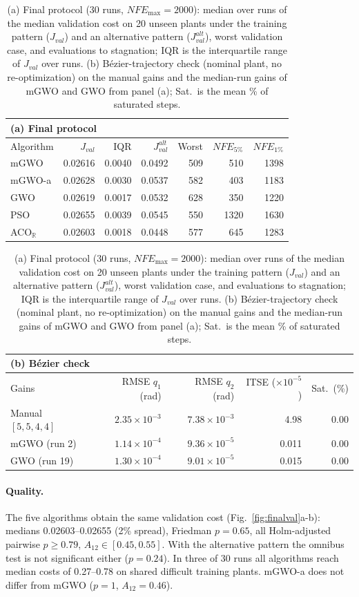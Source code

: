 \documentclass[10pt,journal,compsoc]{IEEEtran}
\newcommand{\mgwo}{mGWO}
\newcommand{\mgwoa}{mGWO-a}
\newcommand{\acor}{ACO$_\mathbb{R}$}
\begin{document}
\begin{table}[t]
\centering\footnotesize
\caption{(a) Final protocol (30 runs, $NFE_{\max}=2000$): median over runs of the median validation cost on 20 unseen plants under the training pattern ($J_{val}$) and an alternative pattern ($J_{val}^{alt}$), worst validation case, and evaluations to stagnation; IQR is the interquartile range of $J_{val}$ over runs. (b) B\'ezier-trajectory check (nominal plant, no re-optimization) on the manual gains and the median-run gains of \mgwo{} and GWO from panel (a); Sat.\ is the mean \% of saturated steps.}
\label{tab:final}
\begin{tabular}{lrrrrrr}
\multicolumn{7}{l}{\textbf{(a) Final protocol}}\\
\toprule
Algorithm & $J_{val}$ & IQR & $J_{val}^{alt}$ & Worst & $NFE_{5\%}$ & $NFE_{1\%}$\\
\midrule
\mgwo{}  & 0.02616 & 0.0040 & 0.0492 & 509 & 510  & 1398\\
\mgwoa{} & 0.02628 & 0.0030 & 0.0537 & 582 & 403  & 1183\\
GWO      & 0.02619 & 0.0017 & 0.0532 & 628 & 350  & 1220\\
PSO      & 0.02655 & 0.0039 & 0.0545 & 550 & 1320 & 1630\\
\acor{}  & 0.02603 & 0.0018 & 0.0448 & 577 & 645  & 1283\\
\bottomrule
\end{tabular}
\hspace{1em}
\begin{tabular}{lrrrr}
\multicolumn{5}{l}{\textbf{(b) B\'ezier check}}\\
\toprule
Gains & RMSE $q_1$ (rad) & RMSE $q_2$ (rad) & ITSE ($\times10^{-5}$) & Sat.\ (\%)\\
\midrule
Manual $[5,5,4,4]$ & $2.35{\times}10^{-3}$ & $7.38{\times}10^{-3}$ & 4.98 & 0.00\\
\mgwo{} (run 2)    & $1.14{\times}10^{-4}$ & $9.36{\times}10^{-5}$ & 0.011 & 0.00\\
GWO (run 19)       & $1.30{\times}10^{-4}$ & $9.01{\times}10^{-5}$ & 0.015 & 0.00\\
\bottomrule
\end{tabular}
\end{table}

\paragraph{Quality.} The five algorithms obtain the same validation cost (Fig.~\ref{fig:finalval}a-b): medians 0.02603--0.02655 (2\% spread), Friedman $p=0.65$, all Holm-adjusted pairwise $p\ge0.79$, $A_{12}\in[0.45,0.55]$. With the alternative pattern the omnibus test is not significant either ($p=0.24$). In three of 30 runs all algorithms reach median costs of 0.27--0.78 on shared difficult training plants. \mgwoa{} does not differ from \mgwo{} ($p=1$, $A_{12}=0.46$).
\end{document}

